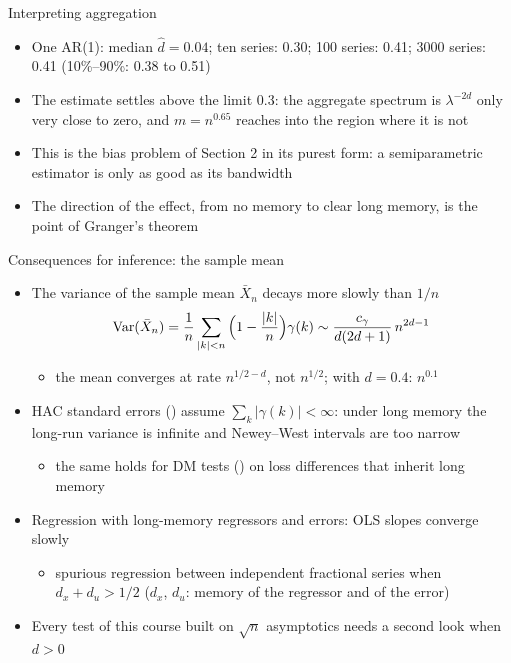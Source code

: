 \begin{frame}{Interpreting aggregation}
\itemsize{\small}
\begin{itemize}
    \item One AR(1): median $\hat d = 0.04$; ten series: 0.30; 100 series: 0.41; 3000 series: 0.41 (10\%--90\%: 0.38 to 0.51)
    \item The estimate settles above the limit 0.3: the aggregate spectrum is $\lambda^{-2d}$ only very close to zero, and $m = n^{0.65}$ reaches into the region where it is not
    \item This is the bias problem of Section 2 in its purest form: a semiparametric estimator is only as good as its bandwidth
    \item The direction of the effect, from no memory to clear long memory, is the point of Granger's theorem
\end{itemize}
\end{frame}

\begin{frame}{Consequences for inference: the sample mean}
\itemsize{\small}
\begin{itemize}
    \item The variance of the sample mean $\bar X_n$ decays more slowly than $1/n$
    \[ \text{Var}(\bar X_n) = \frac1n\sum_{|k|<n}\Big(1 - \frac{|k|}{n}\Big)\gamma(k) \sim \frac{c_\gamma}{d(2d + 1)}\,n^{2d-1} \]
    \begin{itemize}
        \item the mean converges at rate $n^{1/2-d}$, not $n^{1/2}$; with $d = 0.4$: $n^{0.1}$
    \end{itemize}
    \item HAC standard errors () assume $\sum_k|\gamma(k)| < \infty$: under long memory the long-run variance is infinite and Newey--West intervals are too narrow
    \begin{itemize}
        \item the same holds for DM tests () on loss differences that inherit long memory
    \end{itemize}
    \item Regression with long-memory regressors and errors: OLS slopes converge slowly
    \begin{itemize}
        \item spurious regression between independent fractional series when $d_x + d_u > 1/2$ ($d_x$, $d_u$: memory of the regressor and of the error)
    \end{itemize}
    \item Every test of this course built on $\sqrt n$ asymptotics needs a second look when $d > 0$
\end{itemize}
\end{frame}

